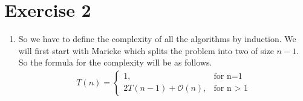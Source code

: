 \documentclass{article}
\newcommand{\bigO}{\mathcal{O}}
\begin{document}
\section*{Exercise 2}
\begin{enumerate}
  \item
  So we have to define the complexity of all the algorithms by induction.
  We will first start with Marieke which splits the problem into two of size $n-1$.
  So the formula for the complexity will be as follows.
  \begin{align*}
    T(n) =
    \begin{cases*}
        1, & \text{for n=1} \\
        2T(n - 1) + \bigO (n), & \text{for n $>$ 1}
    \end{cases*}
  \end{align*}


\end{enumerate}
\end{document}
